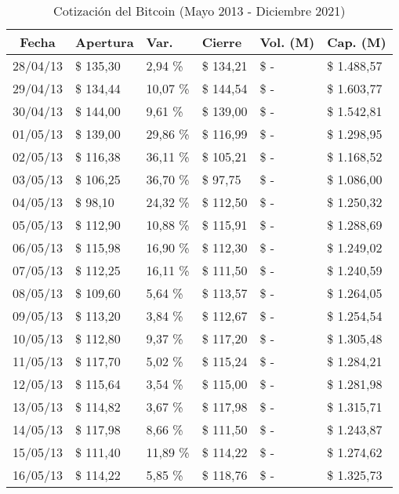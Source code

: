 \begin{small}
\begin{longtable}{|c|l|l|l|l|l|}
\caption{Cotización del Bitcoin (Mayo 2013 - Diciembre 2021)}
\label{tab:cotizacion-btc-dolar}\\
\hline
\textbf{Fecha} & \textbf{Apertura} & \textbf{Var.} & \textbf{Cierre} & \textbf{Vol. (M)} & \textbf{Cap. (M)} \\ \hline
28/04/13 & \$ 135,30 & 2,94 \% & \$ 134,21 & \$ - & \$ 1.488,57 \\ \hline
29/04/13 & \$ 134,44 & 10,07 \% & \$ 144,54 & \$ - & \$ 1.603,77 \\ \hline
30/04/13 & \$ 144,00 & 9,61 \% & \$ 139,00 & \$ - & \$ 1.542,81 \\ \hline
01/05/13 & \$ 139,00 & 29,86 \% & \$ 116,99 & \$ - & \$ 1.298,95 \\ \hline
02/05/13 & \$ 116,38 & 36,11 \% & \$ 105,21 & \$ - & \$ 1.168,52 \\ \hline
03/05/13 & \$ 106,25 & 36,70 \% & \$ 97,75 & \$ - & \$ 1.086,00 \\ \hline
04/05/13 & \$ 98,10 & 24,32 \% & \$ 112,50 & \$ - & \$ 1.250,32 \\ \hline
05/05/13 & \$ 112,90 & 10,88 \% & \$ 115,91 & \$ - & \$ 1.288,69 \\ \hline
06/05/13 & \$ 115,98 & 16,90 \% & \$ 112,30 & \$ - & \$ 1.249,02 \\ \hline
07/05/13 & \$ 112,25 & 16,11 \% & \$ 111,50 & \$ - & \$ 1.240,59 \\ \hline
08/05/13 & \$ 109,60 & 5,64 \% & \$ 113,57 & \$ - & \$ 1.264,05 \\ \hline
09/05/13 & \$ 113,20 & 3,84 \% & \$ 112,67 & \$ - & \$ 1.254,54 \\ \hline
10/05/13 & \$ 112,80 & 9,37 \% & \$ 117,20 & \$ - & \$ 1.305,48 \\ \hline
11/05/13 & \$ 117,70 & 5,02 \% & \$ 115,24 & \$ - & \$ 1.284,21 \\ \hline
12/05/13 & \$ 115,64 & 3,54 \% & \$ 115,00 & \$ - & \$ 1.281,98 \\ \hline
13/05/13 & \$ 114,82 & 3,67 \% & \$ 117,98 & \$ - & \$ 1.315,71 \\ \hline
14/05/13 & \$ 117,98 & 8,66 \% & \$ 111,50 & \$ - & \$ 1.243,87 \\ \hline
15/05/13 & \$ 111,40 & 11,89 \% & \$ 114,22 & \$ - & \$ 1.274,62 \\ \hline
16/05/13 & \$ 114,22 & 5,85 \% & \$ 118,76 & \$ - & \$ 1.325,73 \\ \hline

\end{longtable}
\end{small}
